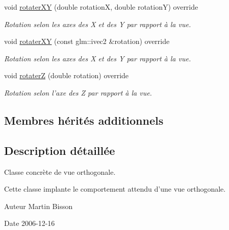 \begin{DoxyCompactItemize}
void \hyperlink{classvue_1_1_vue_ortho_aaf0f6e1a73319c7e5ca17d2744337176}{rotater\-X\-Y} (double rotation\-X, double rotation\-Y) override
\begin{DoxyCompactList}\small\item\em Rotation selon les axes des X et des Y par rapport à la vue. \end{DoxyCompactList}\item 
void \hyperlink{classvue_1_1_vue_ortho_a361e8e059ff672795b7caa3b4c299ab0}{rotater\-X\-Y} (const glm\-::ivec2 \&rotation) override
\begin{DoxyCompactList}\small\item\em Rotation selon les axes des X et des Y par rapport à la vue. \end{DoxyCompactList}\item 
void \hyperlink{classvue_1_1_vue_ortho_acca53793f1990de01476edd87f7c4d7a}{rotater\-Z} (double rotation) override
\begin{DoxyCompactList}\small\item\em Rotation selon l'axe des Z par rapport à la vue. \end{DoxyCompactList}\end{DoxyCompactItemize}
\subsection*{Membres hérités additionnels}


\subsection{Description détaillée}
Classe concrète de vue orthogonale. 

Cette classe implante le comportement attendu d'une vue orthogonale.

\begin{DoxyAuthor}{Auteur}
Martin Bisson 
\end{DoxyAuthor}
\begin{DoxyDate}{Date}
2006-\/12-\/16 
\end{DoxyDate}



